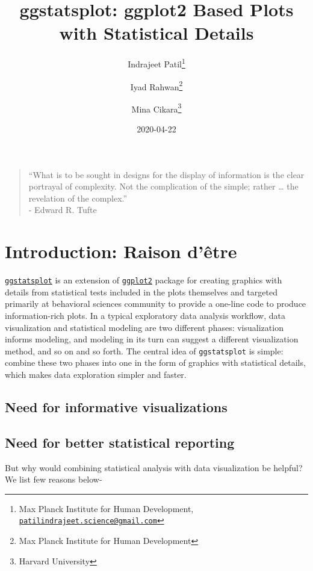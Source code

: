 \documentclass[
]{article}
\title{ggstatsplot: ggplot2 Based Plots with Statistical Details}
\author{Indrajeet Patil\footnote{Max Planck Institute for Human Development, \href{mailto:patilindrajeet.science@gmail.com}{\nolinkurl{patilindrajeet.science@gmail.com}}} \and Iyad Rahwan\footnote{Max Planck Institute for Human Development} \and Mina Cikara\footnote{Harvard University}}
\date{2020-04-22}
\begin{document}
\maketitle

{
\hypersetup{linkcolor=}
\setcounter{tocdepth}{2}
\tableofcontents
}
\begin{quote}
``What is to be sought in designs for the display of information is the clear
portrayal of complexity. Not the complication of the simple; rather \ldots{} the
revelation of the complex.''\\
- Edward R. Tufte
\end{quote}

\hypertarget{introduction-raison-duxeatre}{%
\section{Introduction: Raison d'être}\label{introduction-raison-duxeatre}}

\href{https://indrajeetpatil.github.io/ggstatsplot/}{\texttt{ggstatsplot}} is an extension
of \href{https://github.com/tidyverse/ggplot2}{\texttt{ggplot2}} package for creating
graphics with details from statistical tests included in the plots themselves
and targeted primarily at behavioral sciences community to provide a one-line
code to produce information-rich plots. In a typical exploratory data analysis
workflow, data visualization and statistical modeling are two different phases:
visualization informs modeling, and modeling in its turn can suggest a
different visualization method, and so on and so forth. The central idea of
\texttt{ggstatsplot} is simple: combine these two phases into one in the form of
graphics with statistical details, which makes data exploration simpler and
faster.

\hypertarget{need-for-informative-visualizations}{%
\subsection{Need for informative visualizations}\label{need-for-informative-visualizations}}

\hypertarget{need-for-better-statistical-reporting}{%
\subsection{Need for better statistical reporting}\label{need-for-better-statistical-reporting}}

But why would combining statistical analysis with data visualization be helpful?
We list few reasons below-
\end{document}
